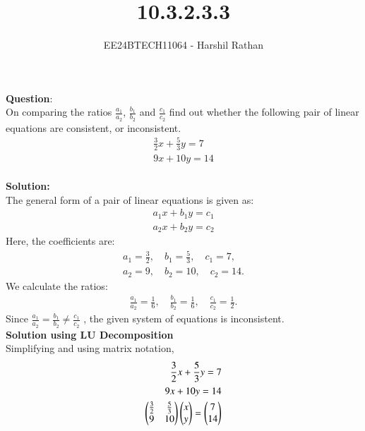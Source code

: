 \documentclass[journal]{IEEEtran}
\begin{document}

\vspace{3cm}

\title{10.3.2.3.3}
\author{EE24BTECH11064 - Harshil Rathan}
 \maketitle
{\let\newpage\relax\maketitle}

\renewcommand{\thefigure}{\theenumi}
\renewcommand{\thetable}{\theenumi}
\setlength{\intextsep}{10pt} %


\renewcommand{\thetable}{\theenumi}
\textbf{Question}:\\
On comparing the ratios $\frac{a_1}{a_2}$, $\frac{b_1}{b_2}$ and $\frac{c_1}{c_2}$ find out whether the following pair of linear equations are consistent, or inconsistent. 
\begin{align*}
    \frac{3}{2}x+\frac{5}{3}y = 7 \\ 9x+10y = 14 
\end{align*}
\\
\textbf{Solution: }\\
The general form of a pair of linear equations is given as:
\begin{align*}
    a_1x + b_1y  = c_1 \\
    a_2x + b_2y = c_2
\end{align*}
Here, the coefficients are:
\begin{align*}
    a_1 = \frac{3}{2}, \quad b_1 = \frac{5}{3}, \quad c_1 = 7, \\
    a_2 = 9, \quad b_2 = 10, \quad c_2 = 14.
\end{align*}
We calculate the ratios:
\begin{align*}
    \frac{a_1}{a_2} = \frac{1}{6}, \quad \frac{b_1}{b_2} = \frac{1}{6}, \quad \frac{c_1}{c_2} = \frac{1}{2}.
\end{align*}
Since $\frac{a_1}{a_2} = \frac{b_1}{b_2} \neq \frac{c_1}{c_2}$ , the given system of equations is inconsistent.\\
\textbf{Solution using LU Decomposition}\\
Simplifying and using matrix notation,
\begin{align}
    \frac{3}{2}x+\frac{5}{3}y = 7\\
    9x+10y = 14\\
    \begin{pmatrix}
        \frac{3}{2} & \frac{5}{3}\\
        9 & 10
    \end{pmatrix} \begin{pmatrix}x \\ y\end{pmatrix}= \begin{pmatrix} 7\\ 14\end{pmatrix}
\end{align}
\end{document}
